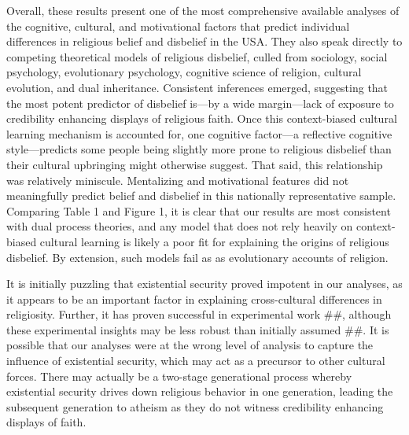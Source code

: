 \documentclass[]{article}
\begin{document}
Overall, these results present one of the most comprehensive available
analyses of the cognitive, cultural, and motivational factors that
predict individual differences in religious belief and disbelief in the
USA. They also speak directly to competing theoretical models of
religious disbelief, culled from sociology, social psychology,
evolutionary psychology, cognitive science of religion, cultural
evolution, and dual inheritance. Consistent inferences emerged,
suggesting that the most potent predictor of disbelief is---by a wide
margin---lack of exposure to credibility enhancing displays of religious
faith. Once this context-biased cultural learning mechanism is accounted
for, one cognitive factor---a reflective cognitive style---predicts some
people being slightly more prone to religious disbelief than their
cultural upbringing might otherwise suggest. That said, this
relationship was relatively miniscule. Mentalizing and motivational
features did not meaningfully predict belief and disbelief in this
nationally representative sample. Comparing Table 1 and Figure 1, it is
clear that our results are most consistent with dual process theories,
and any model that does not rely heavily on context-biased cultural
learning is likely a poor fit for explaining the origins of religious
disbelief. By extension, such models fail as as evolutionary accounts of
religion.

It is initially puzzling that existential security proved impotent in
our analyses, as it appears to be an important factor in explaining
cross-cultural differences in religiosity. Further, it has proven
successful in experimental work \#\#, although these experimental
insights may be less robust than initially assumed \#\#. It is possible
that our analyses were at the wrong level of analysis to capture the
influence of existential security, which may act as a precursor to other
cultural forces. There may actually be a two-stage generational process
whereby existential security drives down religious behavior in one
generation, leading the subsequent generation to atheism as they do not
witness credibility enhancing displays of faith.
\end{document}
